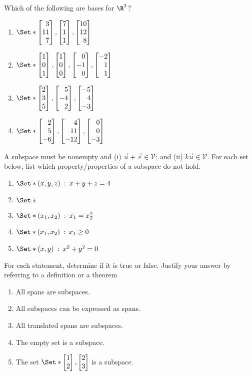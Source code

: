 \begin{exercises}
\begin{problist}
		\prob Which of the following are bases for $\R^3$?
		\begin{enumerate}
			\item $\Set*{\mat{3\\11\\7}, \mat{7\\1\\1}, \mat{10\\12\\8}}$
			\item $\Set*{\mat{1\\0\\1}, \mat{1\\0\\0}, \mat{0\\-1\\0}, \mat{-2\\1\\1}}$
			\item $\Set*{\mat{2\\3\\5}, \mat{5\\-4\\2}, \mat{-5\\4\\-3}}$
			\item $\Set*{\mat{2\\5\\-6}, \mat{4\\11\\-12}, \mat{0\\0\\-3}}$
		\end{enumerate}

		\prob  A subspace must be nonempty and
			(i) $\vec u + \vec v \in \mathcal V$; and
			(ii) $k\vec u \in \mathcal V$.
			For each set below, list which property/properties of a subspace do not hold.
		\begin{enumerate}
			\item $\Set*{(x,y,z)\given x+y+z=4}$
			\item $\Set*{}$
			\item $\Set*{(x_1,x_2)\given x_1=x_2^2}$
			\item $\Set*{(x_1,x_2)\given x_1 \geq 0}$
			\item $\Set*{(x,y)\given x^2+y^2=0}$
		\end{enumerate}

		\prob  For each statement, determine if it is true or false.
		Justify your answer by referring to a definition or a theorem
		\begin{enumerate}
			\item All spans are subspaces.
			\item All subspaces can be expressed as spans.
			\item All translated spans are subspaces.
			\item The empty set is a subspace.
			\item The set $\Set*{\mat{1\\2}, \mat{2\\3}}$ is a subspace.
		\end{enumerate}


\end{problist}
\end{exercises}
